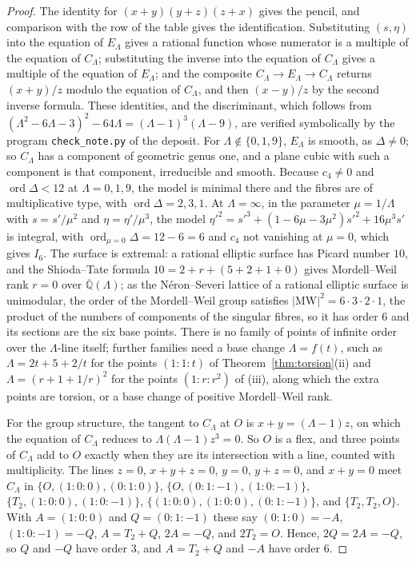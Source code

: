 \documentclass[10pt]{article}
\newcommand{\Q}{\mathbb{Q}}
\begin{document}
\begin{proof}
The identity for $(x+y)(y+z)(z+x)$ gives the pencil, and comparison with the row of the table gives the identification. Substituting $(s,\eta)$ into the equation of $E_\Lambda$ gives a rational function whose numerator is a multiple of the equation of $C_\Lambda$; substituting the inverse into the equation of $C_\Lambda$ gives a multiple of the equation of $E_\Lambda$; and the composite $C_\Lambda\to E_\Lambda\to C_\Lambda$ returns $(x+y)/z$ modulo the equation of $C_\Lambda$, and then $(x-y)/z$ by the second inverse formula. These identities, and the discriminant, which follows from $(\Lambda^2-6\Lambda-3)^2-64\Lambda=(\Lambda-1)^3(\Lambda-9)$, are verified symbolically by the program \texttt{check\_note.py} of the deposit. For $\Lambda\notin\{0,1,9\}$, $E_\Lambda$ is smooth, as $\Delta\ne0$; so $C_\Lambda$ has a component of geometric genus one, and a plane cubic with such a component is that component, irreducible and smooth. Because $c_4\ne0$ and $\operatorname{ord}\Delta<12$ at $\Lambda=0,1,9$, the model is minimal there and the fibres are of multiplicative type, with $\operatorname{ord}\Delta=2,3,1$. At $\Lambda=\infty$, in the parameter $\mu=1/\Lambda$ with $s=s'/\mu^2$ and $\eta=\eta'/\mu^3$, the model $\eta'^2=s'^3+(1-6\mu-3\mu^2)s'^2+16\mu^3s'$ is integral, with $\operatorname{ord}_{\mu=0}\Delta=12-6=6$ and $c_4$ not vanishing at $\mu=0$, which gives $I_6$. The surface is extremal: a rational elliptic surface has Picard number $10$, and the Shioda--Tate formula $10=2+r+(5+2+1+0)$ gives Mordell--Weil rank $r=0$ over $\overline{\Q}(\Lambda)$; as the N\'eron--Severi lattice of a rational elliptic surface is unimodular, the order of the Mordell--Weil group satisfies $|\mathrm{MW}|^2=6\cdot3\cdot2\cdot1$, the product of the numbers of components of the singular fibres, so it has order $6$ and its sections are the six base points. There is no family of points of infinite order over the $\Lambda$-line itself; further families need a base change $\Lambda=f(t)$, such as $\Lambda=2t+5+2/t$ for the points $(1:1:t)$ of Theorem~\ref{thm:torsion}(ii) and $\Lambda=(r+1+1/r)^2$ for the points $(1:r:r^2)$ of (iii), along which the extra points are torsion, or a base change of positive Mordell--Weil rank.

For the group structure, the tangent to $C_\Lambda$ at $O$ is $x+y=(\Lambda-1)z$, on which the equation of $C_\Lambda$ reduces to $\Lambda(\Lambda-1)z^3=0$. So $O$ is a flex, and three points of $C_\Lambda$ add to $O$ exactly when they are its intersection with a line, counted with multiplicity. The lines $z=0$, $x+y+z=0$, $y=0$, $y+z=0$, and $x+y=0$ meet $C_\Lambda$ in $\{O,(1:0:0),(0:1:0)\}$, $\{O,(0:1:-1),(1:0:-1)\}$, $\{T_2,(1:0:0),(1:0:-1)\}$, $\{(1:0:0),(1:0:0),(0:1:-1)\}$, and $\{T_2,T_2,O\}$. With $A=(1:0:0)$ and $Q=(0:1:-1)$ these say $(0:1:0)=-A$, $(1:0:-1)=-Q$, $A=T_2+Q$, $2A=-Q$, and $2T_2=O$. Hence, $2Q=2A=-Q$, so $Q$ and $-Q$ have order $3$, and $A=T_2+Q$ and $-A$ have order $6$.
\end{proof}
\end{document}
